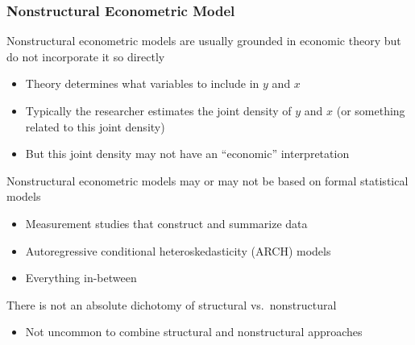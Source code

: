 \documentclass{beamer}
\begin{document}
\begin{frame}\frametitle{Nonstructural Econometric Model}
    Nonstructural econometric models are usually grounded in economic theory but do not incorporate it so directly
    \begin{itemize}
    	\item Theory determines what variables to include in $y$ and $x$
    	\item Typically the researcher estimates the joint density of $y$ and $x$ (or something related to this joint density)
    	\item But this joint density may not have an ``economic'' interpretation
    \end{itemize}
	\vspace{2ex}
	Nonstructural econometric models may or may not be based on formal statistical models
    \begin{itemize}
    	\item Measurement studies that construct and summarize data
    	\item Autoregressive conditional heteroskedasticity (ARCH) models
    	\item Everything in-between
    \end{itemize}
    \vspace{2ex}
	There is not an absolute dichotomy of structural vs.\ nonstructural
	\begin{itemize}
		\item Not uncommon to combine structural and nonstructural approaches
	\end{itemize}
\end{frame}
\end{document}

